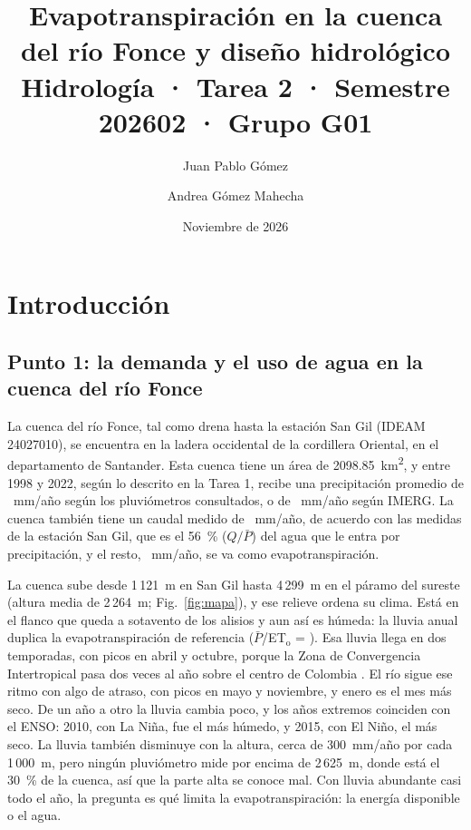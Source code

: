\documentclass[11pt,letterpaper]{article}
\title{Evapotranspiración en la cuenca del río Fonce y diseño hidrológico\\[4pt]
  \large Hidrología · Tarea 2 · Semestre 202602 · Grupo G01}
\author{Juan Pablo Gómez \and Andrea Gómez Mahecha}
\date{Noviembre de 2026}
\newcommand{\ETo}{ET$_\mathrm{o}$}
\newcommand{\Pm}{$\bar{P}$}
\begin{document}
\maketitle

\section{Introducción}

\subsection{Punto 1: la demanda y el uso de agua en la cuenca del río Fonce}

La cuenca del río Fonce, tal como drena hasta la estación San Gil (IDEAM 24027010), se encuentra en la ladera
occidental de la cordillera Oriental, en el departamento de Santander. Esta cuenca tiene un área de
\SI{2098.85}{km^2}, y entre 1998 y 2022, según lo descrito en la Tarea 1, recibe una precipitación promedio de
\cifraPL~mm/año según los pluviómetros consultados, o de \cifraPI~mm/año según IMERG. La cuenca también tiene un
caudal medido de \cifraQ~mm/año, de acuerdo con las medidas de la estación San Gil, que es el 56~\% ($Q/\bar{P}$) del
agua que le entra por precipitación, y el resto, \cifraETbalance~mm/año, se va como evapotranspiración.


La cuenca sube desde 1\,121~m en San Gil hasta 4\,299~m en el páramo del sureste (altura media de 2\,264~m; Fig.~\ref{fig:mapa}),
y ese relieve ordena su clima. Está en el flanco que queda a sotavento de los alisios y aun así es húmeda: la lluvia anual
duplica la evapotranspiración de referencia (\Pm/\ETo{} = \cifraPsobreETo). Esa lluvia llega en dos temporadas, con picos en abril y
octubre, porque la Zona de Convergencia Intertropical pasa dos veces al año sobre el centro de Colombia
\citep{poveda2004}. El río sigue ese ritmo con algo de atraso, con picos en mayo y noviembre, y enero es el mes más
seco. De un año a otro la lluvia cambia poco, y los años extremos coinciden con el ENSO: 2010, con La Niña, fue el más
húmedo, y 2015, con El Niño, el más seco. La lluvia también disminuye con la altura, cerca de 300~mm/año por cada
1\,000~m, pero ningún pluviómetro mide por encima de 2\,625~m, donde está el 30~\% de la cuenca, así que la parte alta
se conoce mal. Con lluvia abundante casi todo el año, la pregunta es qué limita la evapotranspiración:
la energía disponible o el agua.
\end{document}

